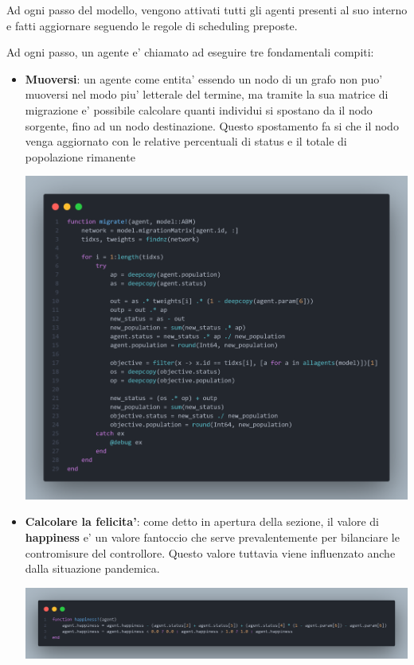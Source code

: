 Ad ogni passo del modello, vengono attivati tutti gli agenti presenti al suo interno e 
fatti aggiornare seguendo le regole di scheduling preposte. 

Ad ogni passo, un agente e' chiamato ad eseguire tre fondamentali compiti:
\begin{itemize}
	\item \textbf{Muoversi}: un agente come entita' essendo un nodo di un grafo non puo'
	muoversi nel modo piu' letterale del termine, ma tramite la sua matrice di migrazione 
	e' possibile calcolare quanti individui si spostano da il nodo sorgente, fino ad un nodo
	destinazione. Questo spostamento fa si che il nodo venga aggiornato con le relative percentuali
	di status e il totale di popolazione rimanente

	\begin{minipage}{\linewidth}
		\centering
		\includegraphics[width=\textwidth]{img/migratef.png}
		\label{fig:migrationf}
	\end{minipage}

	\item \textbf{Calcolare la felicita'}: come detto in apertura della sezione, il valore di \textbf{happiness}
	e' un valore fantoccio che serve prevalentemente per bilanciare le contromisure del controllore.
	Questo valore tuttavia viene influenzato anche dalla situazione pandemica. 
	
	\begin{minipage}{\linewidth}
		\centering
		\includegraphics[width=\textwidth]{img/happiness.png}
		\label{fig:happinessf}
	\end{minipage}


\end{itemize}
